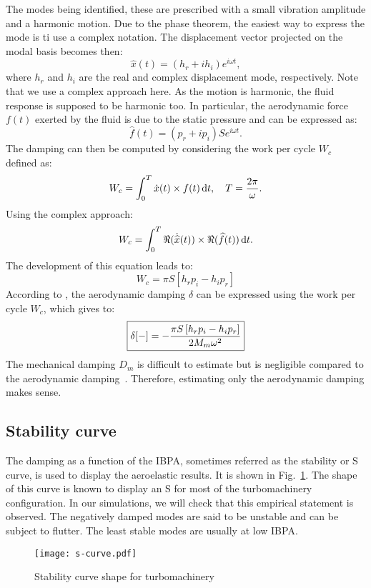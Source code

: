 The modes being identified, these are prescribed
with a small vibration amplitude and a harmonic motion.
Due to the phase theorem, the easiest way to express
the mode is ti use a complex notation.
The displacement vector projected on the modal basis becomes then:
\begin{equation}
   \widehat{x}(t) = (h_r + i h_i) e^{i \omega t},
   \label{eq:harm_vib_displ_vector}
\end{equation}
where $h_r$ and $h_i$ are the real and complex displacement
mode, respectively.
Note that we use a complex approach here.
As the motion is harmonic, the fluid response is
supposed to be harmonic too.
In particular, the aerodynamic force $f (t)$ exerted by the fluid is due to the
static pressure and can be expressed as:
\begin{equation}
    \widehat{f}(t) = (p_r + i p_i) S e^{i \omega t}.
\end{equation}
The damping can then be computed by considering the 
work per cycle $W_c$ defined as:
\begin{equation}
    W_c = \int_0^T \dot{x} (t) \times f(t) \mathop{}\!\mathrm{d} t, \quad T = \frac{2 \pi}{\omega}.
\end{equation}
Using the complex approach:
\begin{equation}
    W_c = \int_0^T \Re (\dot{\widehat{x}} (t)) \times \Re (\widehat{f}(t)) \mathop{}\!\mathrm{d} t.
\end{equation}
The development of this equation leads to:
\begin{equation}
    W_c = \pi S \left[h_r p_i - h_i p_r \right]
\end{equation}
According to \citet{Carta1967}, the aerodynamic 
damping $\delta$ can be expressed using the
work per cycle $W_c$, which gives to:
\begin{equation}
    \fbox{$
    \delta [-] = - \displaystyle \frac{\pi S \left[h_r p_i - h_i p_r \right]}{2 M_m \omega^2}
    $}
\end{equation}
The mechanical damping $D_m$ is difficult to estimate
but is negligible compared to the aerodynamic damping~\cite{Mikolajczak1975}.
Therefore, estimating only the aerodynamic damping makes sense.

\subsection{Stability curve}
\label{sub:s_curve}

The damping as a function of the IBPA, sometimes
referred as the stability or S curve, is used to
display the aeroelastic results. It is shown in
Fig.~\ref{fig:s-curve}. The shape of this curve is
known to display an S for most of the
turbomachinery configuration. 
In our simulations, we will check that this empirical
statement is observed.
The negatively damped modes are said to
be unstable and can be subject to flutter. 
The least stable modes are usually at low IBPA.
\begin{figure}[htp]
  \centering
  \texttt{[image: s-curve.pdf]}
  \caption{Stability curve shape for turbomachinery}
  \label{fig:s-curve}
\end{figure}
